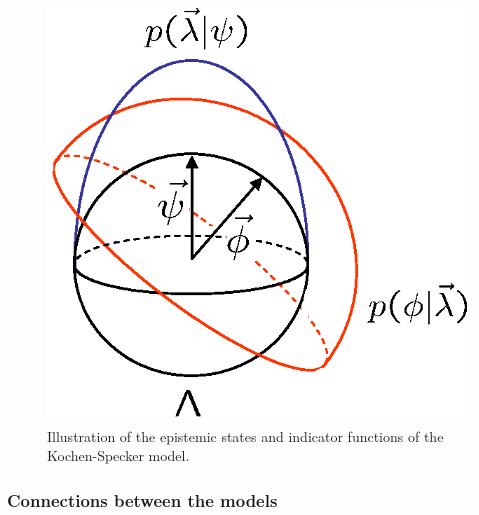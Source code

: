 \documentclass[aps,nofootinbib,12pt]{revtex4-2}
\begin{document}
\begin{figure}[t]
\includegraphics[scale=0.6]{ksmodel}\caption{Illustration of the epistemic
states and indicator functions of the Kochen-Specker model.}
\label{FIG:ksmodel}
\end{figure}

\subsubsection{Connections between the models}
\end{document}
